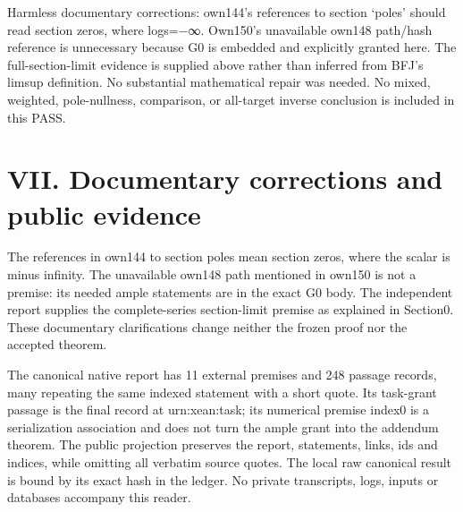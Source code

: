 \documentclass[
  10pt,
]{article}
\begin{document}
Harmless documentary corrections: own144's references to section `poles'
should read section zeros, where log\textbar s\textbar=−∞. Own150's
unavailable own148 path/hash reference is unnecessary because G0 is
embedded and explicitly granted here. The full-section-limit evidence is
supplied above rather than inferred from BFJ's limsup definition. No
substantial mathematical repair was needed. No mixed, weighted,
pole-nullness, comparison, or all-target inverse conclusion is included
in this PASS.

\section{VII. Documentary corrections and public
evidence}\label{vii.-documentary-corrections-and-public-evidence}

The references in own144 to section poles mean section zeros, where the
scalar is minus infinity. The unavailable own148 path mentioned in
own150 is not a premise: its needed ample statements are in the exact G0
body. The independent report supplies the complete-series section-limit
premise as explained in Section0. These documentary clarifications
change neither the frozen proof nor the accepted theorem.

The canonical native report has 11 external premises and 248 passage
records, many repeating the same indexed statement with a short quote.
Its task-grant passage is the final record at urn:xean:task; its
numerical premise index0 is a serialization association and does not
turn the ample grant into the addendum theorem. The public projection
preserves the report, statements, links, ids and indices, while omitting
all verbatim source quotes. The local raw canonical result is bound by
its exact hash in the ledger. No private transcripts, logs, inputs or
databases accompany this reader.
\end{document}
